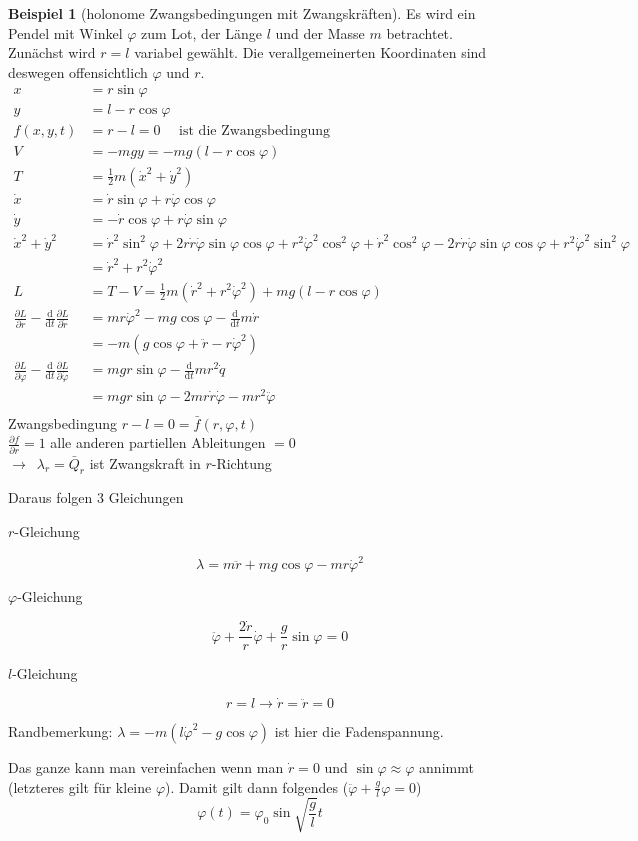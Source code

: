 \documentclass[oneside]{book}
\theoremstyle{definition}
\newtheorem*{beispiel*}{Beispiel}
\newcommand{\conseq}{$\rightarrow$~}
\renewcommand{\d}{\mathrm d}
\newcommand{\dd}[1]{\frac{\d}{\d #1}}
\newcommand{\ffpartial}[2]{\frac{\partial #1}{\partial #2}}
\newcommand{\vp}{\varphi}
\begin{document}
\begin{beispiel*}[holonome Zwangsbedingungen mit Zwangskräften]
Es wird ein Pendel mit Winkel $\varphi$ zum Lot, der Länge $l$ und der Masse $m$ betrachtet.
Zunächst wird $r=l$ variabel gewählt. Die verallgemeinerten Koordinaten sind deswegen offensichtlich $\varphi$ und $r$.
\begin{align*}
x &= r \sin \varphi\\
y &= l - r \cos \varphi\\
f(x,y,t) &= r - l = 0 \text{~~~~ist die Zwangsbedingung}\\
V &= -mg y = -mg (l -r \cos \varphi)\\
T &= \frac12 m (\dot{x}^2 + \dot{y}^2)\\
\dot{x} &= \dot{r} \sin \varphi + r \dot{\varphi} \cos \varphi\\
\dot{y} &= - \dot{r} \cos \varphi + r \dot{\varphi} \sin \varphi\\
\dot{x}^2 + \dot{y}^2 &= \dot{r}^2 \sin^2 \varphi + 2 r \dot{r} \dot\varphi \sin \varphi \cos \varphi + r^2 \dot{\varphi}^2 \cos^2 \varphi + \dot{r}^2 \cos^2 \varphi - 2 r \dot r \dot \varphi \sin \varphi \cos \varphi + r^2 \dot{\varphi}^2 \sin^2 \varphi \\
&= \dot{r}^2 + r^2 \dot{\varphi}^2\\
L &= T-V = \frac12 m (\dot{r}^2 + r^2 \dot{\varphi}^2) + mg(l - r \cos \varphi)\\
\ffpartial{L}{r} - \dd t \ffpartial{L}{\dot{r}} &= m r \dot{\varphi}^2 - mg \cos \varphi - \dd t m \dot{r} \\
&= -m (g \cos \varphi + \ddot{r} - r \dot{\varphi}^2)\\
\ffpartial{L}{\varphi} - \dd t \ffpartial{L}{\dot{\varphi}} &= mgr \sin \varphi - \dd t m r^2 \dot{q} \\
&= mgr \sin \varphi - 2mr\dot{r}\dot{\varphi} - mr^2 \ddot{\varphi}\\
\end{align*}
Zwangsbedingung $r-l = 0 = \bar{f}(r, \varphi, t)$\\
$\ffpartial{f}{r} = 1$ alle anderen partiellen Ableitungen $= 0$\\
\conseq $\lambda_r = \bar{Q}_r$ ist Zwangskraft in $r$-Richtung

Daraus folgen 3 Gleichungen
\begin{description}
	\item[$r$-Gleichung] $$\lambda = m \ddot{r} + mg \cos \varphi - m r \dot{\varphi}^2$$
	\item[$\varphi$-Gleichung] $$\ddot{\varphi} + \frac{2 \dot{r}}{r} \dot{\varphi} + \frac{g}{r} \sin \varphi = 0$$
	\item[$l$-Gleichung] $$r = l \rightarrow \dot{r} = \ddot{r} = 0 $$
\end{description}
Randbemerkung: $\lambda = -m(l \dot{\varphi}^2 - g \cos \varphi)$ ist hier die Fadenspannung.

Das ganze kann man vereinfachen wenn man $\dot{r} = 0$ und $\sin \varphi \approx \varphi$ annimmt (letzteres gilt für kleine $\varphi$). Damit gilt dann folgendes ($\ddot{\vp} + \frac{g}{l} \vp = 0$)
$$\varphi(t) = \varphi_0 \sin \sqrt{\frac{g}{l}} t$$
\end{beispiel*}
\end{document}
